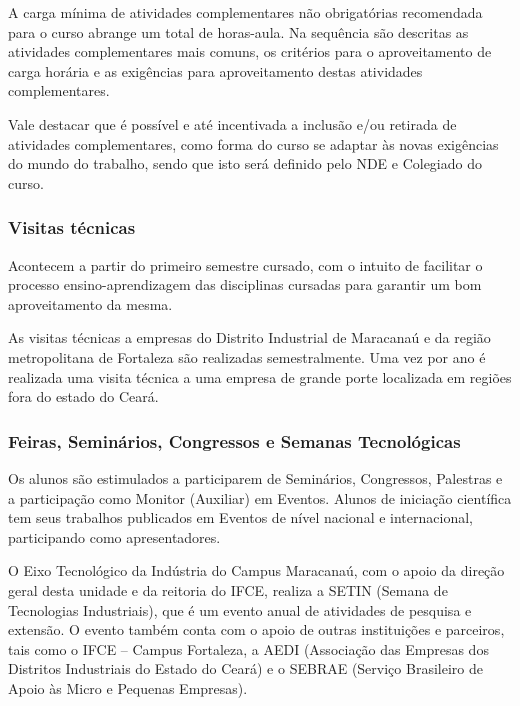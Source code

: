 A carga mínima de atividades complementares não obrigatórias recomendada para o curso abrange um total de \CHCOMP horas-aula. Na sequência são descritas as atividades complementares mais comuns, os critérios para o aproveitamento de carga horária e as exigências para aproveitamento destas atividades complementares. 

Vale destacar que é possível e até incentivada a inclusão e/ou retirada de atividades complementares, como forma do curso se adaptar às novas exigências do mundo do trabalho, sendo que isto será definido pelo NDE e Colegiado do curso.

\subsubsection{Visitas técnicas}

Acontecem a partir do primeiro semestre cursado, com o intuito de facilitar o processo ensino-aprendizagem das
disciplinas cursadas para garantir um bom aproveitamento da mesma.

As visitas técnicas a empresas do Distrito Industrial de Maracanaú e da região metropolitana de Fortaleza são realizadas semestralmente. Uma vez por ano é realizada uma visita técnica a uma empresa de grande porte localizada em regiões fora do estado do Ceará.

\subsubsection{Feiras, Seminários, Congressos e Semanas Tecnológicas}

Os alunos são estimulados a participarem de Seminários, Congressos, Palestras e a participação como Monitor (Auxiliar) em Eventos. Alunos de iniciação científica tem seus trabalhos publicados em Eventos de nível nacional e internacional, participando como apresentadores.


O Eixo Tecnológico da Indústria do Campus Maracanaú, com o apoio da direção geral desta unidade e da reitoria do IFCE, realiza a SETIN (Semana de Tecnologias Industriais), que é um evento anual de atividades de pesquisa e extensão. O evento também conta com o apoio de outras instituições e parceiros, tais como o IFCE – Campus Fortaleza, a AEDI (Associação das Empresas dos Distritos Industriais do Estado do Ceará) e o SEBRAE (Serviço Brasileiro de Apoio às Micro e Pequenas Empresas).


